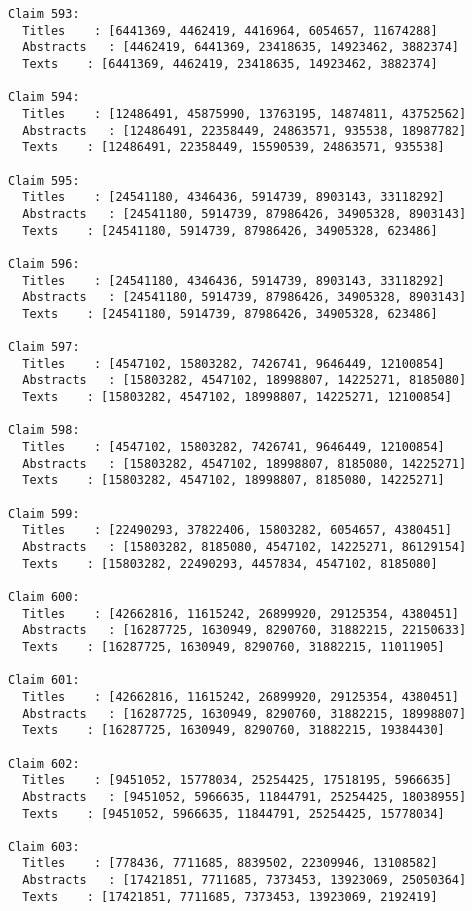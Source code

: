 \documentclass[11pt]{article}
\begin{document}
\begin{Verbatim}[commandchars=\\\{\}]
Claim 593:
  Titles    : [6441369, 4462419, 4416964, 6054657, 11674288]
  Abstracts   : [4462419, 6441369, 23418635, 14923462, 3882374]
  Texts    : [6441369, 4462419, 23418635, 14923462, 3882374]

Claim 594:
  Titles    : [12486491, 45875990, 13763195, 14874811, 43752562]
  Abstracts   : [12486491, 22358449, 24863571, 935538, 18987782]
  Texts    : [12486491, 22358449, 15590539, 24863571, 935538]

Claim 595:
  Titles    : [24541180, 4346436, 5914739, 8903143, 33118292]
  Abstracts   : [24541180, 5914739, 87986426, 34905328, 8903143]
  Texts    : [24541180, 5914739, 87986426, 34905328, 623486]

Claim 596:
  Titles    : [24541180, 4346436, 5914739, 8903143, 33118292]
  Abstracts   : [24541180, 5914739, 87986426, 34905328, 8903143]
  Texts    : [24541180, 5914739, 87986426, 34905328, 623486]

Claim 597:
  Titles    : [4547102, 15803282, 7426741, 9646449, 12100854]
  Abstracts   : [15803282, 4547102, 18998807, 14225271, 8185080]
  Texts    : [15803282, 4547102, 18998807, 14225271, 12100854]

Claim 598:
  Titles    : [4547102, 15803282, 7426741, 9646449, 12100854]
  Abstracts   : [15803282, 4547102, 18998807, 8185080, 14225271]
  Texts    : [15803282, 4547102, 18998807, 8185080, 14225271]

Claim 599:
  Titles    : [22490293, 37822406, 15803282, 6054657, 4380451]
  Abstracts   : [15803282, 8185080, 4547102, 14225271, 86129154]
  Texts    : [15803282, 22490293, 4457834, 4547102, 8185080]

Claim 600:
  Titles    : [42662816, 11615242, 26899920, 29125354, 4380451]
  Abstracts   : [16287725, 1630949, 8290760, 31882215, 22150633]
  Texts    : [16287725, 1630949, 8290760, 31882215, 11011905]

Claim 601:
  Titles    : [42662816, 11615242, 26899920, 29125354, 4380451]
  Abstracts   : [16287725, 1630949, 8290760, 31882215, 18998807]
  Texts    : [16287725, 1630949, 8290760, 31882215, 19384430]

Claim 602:
  Titles    : [9451052, 15778034, 25254425, 17518195, 5966635]
  Abstracts   : [9451052, 5966635, 11844791, 25254425, 18038955]
  Texts    : [9451052, 5966635, 11844791, 25254425, 15778034]

Claim 603:
  Titles    : [778436, 7711685, 8839502, 22309946, 13108582]
  Abstracts   : [17421851, 7711685, 7373453, 13923069, 25050364]
  Texts    : [17421851, 7711685, 7373453, 13923069, 2192419]


\end{Verbatim}
\end{document}
